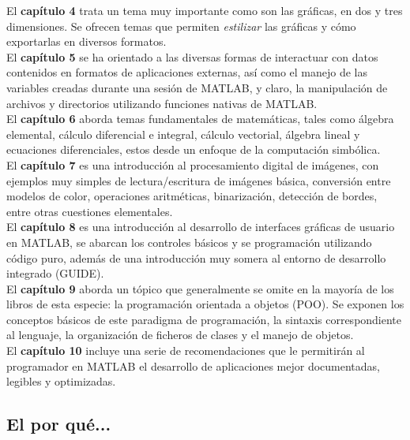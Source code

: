 El \textbf{capítulo 4} trata un tema muy importante como son las
gráficas, en dos y tres dimensiones. Se ofrecen temas que permiten
\emph{estilizar} las gráficas y cómo exportarlas en diversos formatos. \\

El \textbf{capítulo 5} se ha orientado a las diversas formas de
interactuar con datos contenidos en formatos de aplicaciones externas,
así como el manejo de las variables creadas durante una sesión de
MATLAB, y claro, la manipulación de archivos y directorios utilizando
funciones nativas de MATLAB. \\

El \textbf{capítulo 6} aborda temas fundamentales de matemáticas, tales
como álgebra elemental, cálculo diferencial e integral, cálculo
vectorial, álgebra lineal y ecuaciones diferenciales, estos desde un
enfoque de la computación simbólica. \\

El \textbf{capítulo 7} es una introducción al procesamiento digital de
imágenes, con ejemplos muy simples de lectura/escritura de imágenes
básica, conversión entre modelos de color, operaciones aritméticas,
binarización, detección de bordes, entre otras cuestiones elementales. \\

El \textbf{capítulo 8} es una introducción al desarrollo de interfaces
gráficas de usuario en MATLAB, se abarcan los controles básicos y se
programación utilizando código puro, además de una introducción muy
somera al entorno de desarrollo integrado (GUIDE). \\

El \textbf{capítulo 9} aborda un tópico que generalmente se omite en la
mayoría de los libros de esta especie: la programación orientada a
objetos (POO). Se exponen los conceptos básicos de este paradigma de
programación, la sintaxis correspondiente al lenguaje, la organización
de ficheros de clases y el manejo de objetos. \\
 
El \textbf{capítulo 10} incluye una serie de recomendaciones que le
permitirán al programador en MATLAB el desarrollo de aplicaciones mejor
documentadas, legibles y optimizadas. \\

\subsection*{El por qué...}


